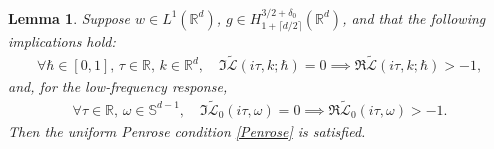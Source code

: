 \documentclass[10pt,a4paper]{article}
\theoremstyle{plain}
\newtheorem{lemma}[theorem]{Lemma}
\theoremstyle{remark}
\newcommand{\R}{\mathbb{R}}
\begin{document}
\begin{lemma}\label{argumentprinciplelemma}
Suppose \( w \in L^1(\R^d) \), \( g \in H^{3/2+\delta_0}_{1+\lceil d/2 \rceil}(\R^d) \), and that the following implications hold:\begin{align}
\label{impliesPenrose}\forall\hbar\in[0,1],\,\tau\in\R,\,k\in\R^d,\quad \Im\widetilde {\mathscr L}(i\tau,k;\hbar)=0\implies \Re\widetilde {\mathscr L}(i\tau,k;\hbar)>-1,
\end{align}and, for the low-frequency response,
\begin{align}
\label{impliesPenrose0}\forall\tau\in\R,\,\omega\in\mathbb S^{d-1},\quad \Im\widetilde {\mathscr L}_0(i\tau,\omega)=0\implies \Re\widetilde {\mathscr L}_0(i\tau,\omega)>-1.
\end{align} Then the uniform Penrose condition \eqref{Penrose} is satisfied.
\end{lemma}
\end{document}
